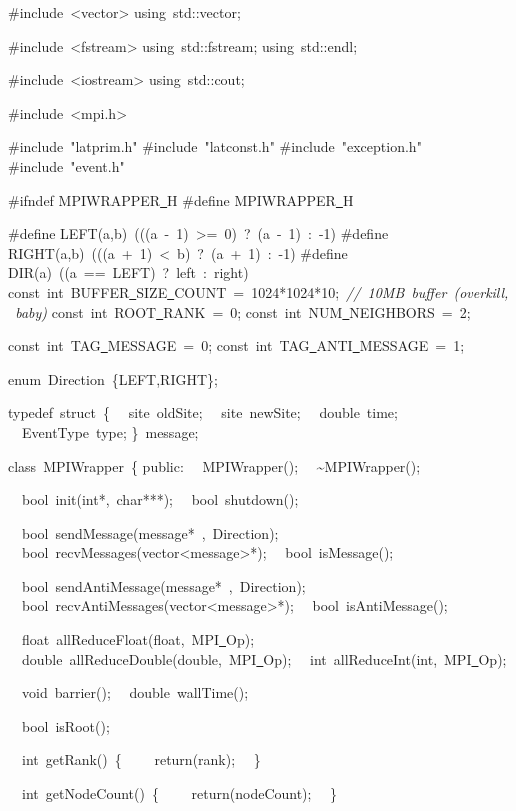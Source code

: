 {\ttfamily \raggedright \footnotesize
\#include\ <{}vector>{}
using\ std::vector;

\#include\ <{}fstream>{}
using\ std::fstream;
using\ std::endl;

\#include\ <{}iostream>{}
using\ std::cout;

\#include\ <{}mpi.h>{}

\#include\ "{}latprim.h"{}
\#include\ "{}latconst.h"{}
\#include\ "{}exception.h"{}
\#include\ "{}event.h"{}

\#ifndef MPIWRAPPER\underline\ H
\#define MPIWRAPPER\underline\ H

\#define LEFT(a,b)\ (((a\ -{}\ 1)\ >{}=\ 0)\ ?\ (a\ -{}\ 1)\ :\ -{}1)
\#define RIGHT(a,b)\ (((a\ +\ 1)\ <{}\ b)\ ?\ (a\ +\ 1)\ :\ -{}1)
\#define DIR(a)\ ((a\ ==\ LEFT)\ ?\ left\ :\ right)
const\ int\ BUFFER\underline\ SIZE\underline\ COUNT\ =\ 1024*1024*10;\ \textsl{//\ 10MB\ buffer\ (overkill,\ baby)}
const\ int\ ROOT\underline\ RANK\ =\ 0;
const\ int\ NUM\underline\ NEIGHBORS\ =\ 2;

const\ int\ TAG\underline\ MESSAGE\ =\ 0;
const\ int\ TAG\underline\ ANTI\underline\ MESSAGE\ =\ 1;

enum\ Direction\ \{LEFT,RIGHT\};

typedef\ struct\ \{
\ \ site\ oldSite;
\ \ site\ newSite;
\ \ double\ time;
\ \ EventType\ type;
\}\ message;

class\ MPIWrapper\ \{
public:
\ \ MPIWrapper();
\ \ \textasciitilde MPIWrapper();

\ \ bool\ init(int*,\ char***);
\ \ bool\ shutdown();

\ \ bool\ sendMessage(message*\ ,\ Direction);
\ \ bool\ recvMessages(vector<{}message>{}*);
\ \ bool\ isMessage();

\ \ bool\ sendAntiMessage(message*\ ,\ Direction);
\ \ bool\ recvAntiMessages(vector<{}message>{}*);
\ \ bool\ isAntiMessage();

\ \ float\ allReduceFloat(float,\ MPI\underline\ Op);
\ \ double\ allReduceDouble(double,\ MPI\underline\ Op);
\ \ int\ allReduceInt(int,\ MPI\underline\ Op);

\ \ void\ barrier();
\ \ double\ wallTime();

\ \ bool\ isRoot();

\ \ int\ getRank()\ \{
\ \ \ \ return(rank);
\ \ \}

\ \ int\ getNodeCount()\ \{
\ \ \ \ return(nodeCount);
\ \ \}

}
